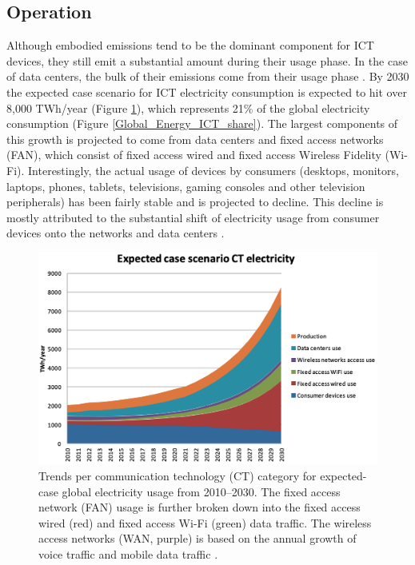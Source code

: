 \documentclass{article}
\begin{document}
\subsection{Operation}
Although embodied emissions tend to be the dominant component for ICT devices, they still emit a substantial amount during their usage phase. In the case of data centers, the bulk of their emissions come from their usage phase \cite{andrae2015global, malmodin2014life, irishtimes2016datacentre}. By 2030 the expected case scenario for ICT electricity consumption is expected to hit over 8,000 TWh/year (Figure \ref{Global_Energy_ICT_components}), which represents 21\% of the global electricity consumption (Figure \ref{Global_Energy_ICT_share}). The largest components of this growth is projected to come from data centers and fixed access networks (FAN), which consist of fixed access wired and fixed access Wireless Fidelity (Wi-Fi). Interestingly, the actual usage of devices by consumers (desktops, monitors, laptops, phones, tablets, televisions, gaming consoles and other television peripherals) has been fairly stable and is projected to decline. This decline is mostly attributed to the substantial shift of electricity usage from consumer devices onto the networks and data centers \cite{andrae2015global}.

\begin{figure}[h]
    \includegraphics[width=.8 \textwidth]{./images/Global_Energy_ICT_components.png}
    \centering
    \caption{Trends per communication technology (CT) category for expected-case global electricity usage from 2010–2030. The fixed access network (FAN) usage is further broken down into the fixed access wired (red) and fixed access Wi-Fi (green) data traffic. The wireless access networks (WAN, purple) is based on the annual growth of voice traffic and mobile data traffic \cite{andrae2015global}.}
    \label{Global_Energy_ICT_components}
\end{figure}
\end{document}
